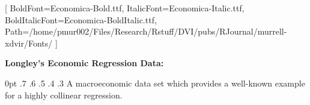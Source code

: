 \setmainfont{Economica-Regular.ttf}[
  BoldFont=Economica-Bold.ttf,
  ItalicFont=Economica-Italic.ttf,
  BoldItalicFont=Economica-BoldItalic.ttf,
  Path=/home/pmur002/Files/Research/Rstuff/DVI/pubs/RJournal/murrell-xdvir/Fonts/ 
]
\fontsize{14}{16}\selectfont
\begin{minipage}{3in}
{\bf Longley's Economic Regression Data:}

0pt .7\textwidth
0pt .6\textwidth
0pt .5\textwidth
0pt .4\textwidth
0pt .3\textwidth
A macroeconomic data set which provides a well-known example for a
highly collinear regression.

\end{minipage}
